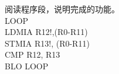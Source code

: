 \documentclass[11pt,letter,notitlepage,UTF8]{ctexart}
\begin{document}
\begin{exercise}[7.11]
	阅读程序段，说明完成的功能。\\
	LOOP\\
	LDMIA R12!,(R0-R11)\\
	STMIA R13!, (R0-R11)\\
	CMP R12, R13\\
	BLO LOOP\\
\end{exercise}




\end{document}
